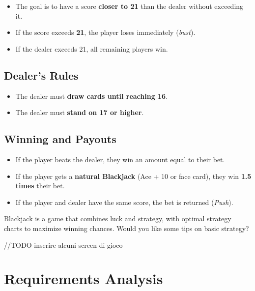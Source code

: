 \begin{itemize}
    \item The goal is to have a score \textbf{closer to 21} than the dealer without exceeding it.
    \item If the score exceeds \textbf{21}, the player loses immediately (\textit{bust}).
    \item If the dealer exceeds 21, all remaining players win.
\end{itemize}

\section{Dealer's Rules}

\begin{itemize}
    \item The dealer must \textbf{draw cards until reaching 16}.
    \item The dealer must \textbf{stand on 17 or higher}.
\end{itemize}

\section{Winning and Payouts}

\begin{itemize}
    \item If the player beats the dealer, they win an amount equal to their bet.
    \item If the player gets a \textbf{natural Blackjack} (Ace + 10 or face card), they win \textbf{1.5 times} their bet.
    \item If the player and dealer have the same score, the bet is returned (\textit{Push}).
\end{itemize}

Blackjack is a game that combines luck and strategy, with optimal strategy charts to maximize winning chances. Would you like some tips on basic strategy?


//TODO inserire alcuni screen di gioco 


\chapter{Requirements Analysis}

